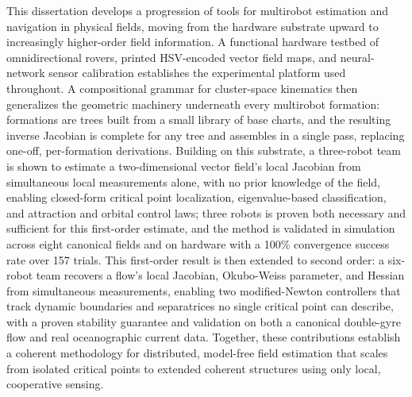 \documentclass[12pt, letterpaper, oneside]{report}
\begin{document}
\noindent
This dissertation develops a progression of tools for multirobot estimation
and navigation in physical fields, moving from the hardware substrate upward
to increasingly higher-order field information. A functional hardware testbed
of omnidirectional rovers, printed HSV-encoded vector field maps, and
neural-network sensor calibration establishes the experimental platform used
throughout. A compositional grammar for cluster-space kinematics then
generalizes the geometric machinery underneath every multirobot formation:
formations are trees built from a small library of base charts, and the
resulting inverse Jacobian is complete for any tree and assembles in a single
pass, replacing one-off, per-formation derivations. Building on this
substrate, a three-robot team is shown to estimate a two-dimensional vector
field's local Jacobian from simultaneous local measurements alone, with no
prior knowledge of the field, enabling closed-form critical point
localization, eigenvalue-based classification, and attraction and orbital
control laws; three robots is proven both necessary and sufficient for this
first-order estimate, and the method is validated in simulation across eight
canonical fields and on hardware with a 100\% convergence success rate over
157 trials. This first-order result is then extended to second order: a
six-robot team recovers a flow's local Jacobian, Okubo-Weiss parameter, and
Hessian from simultaneous measurements, enabling two modified-Newton
controllers that track dynamic boundaries and separatrices no single critical
point can describe, with a proven stability guarantee and validation on both
a canonical double-gyre flow and real oceanographic current data. Together,
these contributions establish a coherent methodology for distributed,
model-free field estimation that scales from isolated critical points to
extended coherent structures using only local, cooperative sensing.

\clearpage

%
\end{document}
